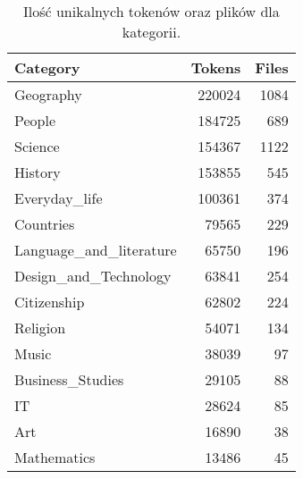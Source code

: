 \begin{table}[H]
    \centering
        \begin{tabular}{lrr}
            \toprule
                           Category &  Tokens &  Files \\
            \midrule
                          Geography &  220024 &   1084 \\
                             People &  184725 &    689 \\
                            Science &  154367 &   1122 \\
                            History &  153855 &    545 \\
                      Everyday\_life &  100361 &    374 \\
                          Countries &   79565 &    229 \\
            Language\_and\_literature &   65750 &    196 \\
              Design\_and\_Technology &   63841 &    254 \\
                        Citizenship &   62802 &    224 \\
                           Religion &   54071 &    134 \\
                              Music &   38039 &     97 \\
                   Business\_Studies &   29105 &     88 \\
                                 IT &   28624 &     85 \\
                                Art &   16890 &     38 \\
                        Mathematics &   13486 &     45 \\
            \bottomrule
        \end{tabular}
        \vspace{0.25cm}
        \caption{Ilość unikalnych tokenów oraz plików dla kategorii.}
        \label{tab:categories_table}
\end{table}
